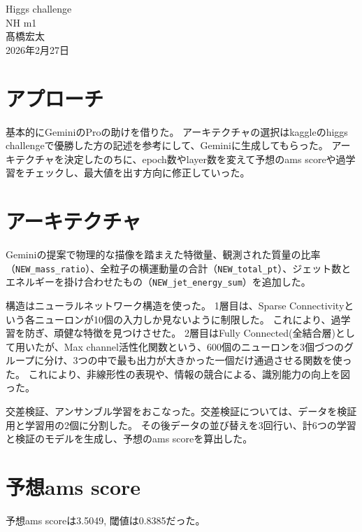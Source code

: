 \documentclass[12pt,a4paper]{jsarticle}
\begin{document}
\vspace{-5pt}
\begin{center}
{\gt \Large Higgs challenge }\\[14pt]

{\gt \large NH m1 \\ 髙橋宏太 \\ 2026年2月27日}\\[5pt]



\end{center}

\vspace{10pt}

\section{アプローチ}
基本的にGeminiのProの助けを借りた。
アーキテクチャの選択はkaggleのhiggs challengeで優勝した方の記述を参考にして、Geminiに生成してもらった。
アーキテクチャを決定したのちに、epoch数やlayer数を変えて予想のams scoreや過学習をチェックし、最大値を出す方向に修正していった。

\section{アーキテクチャ}
Geminiの提案で物理的な描像を踏まえた特徴量、観測された質量の比率（\texttt{NEW\_mass\_ratio}）、全粒子の横運動量の合計（\texttt{NEW\_total\_pt}）、ジェット数とエネルギーを掛け合わせたもの（\texttt{NEW\_jet\_energy\_sum}）を追加した。

構造はニューラルネットワーク構造を使った。
1層目は、Sparse Connectivityという各ニューロンが10個の入力しか見ないように制限した。
これにより、過学習を防ぎ、頑健な特徴を見つけさせた。
2層目はFully Connected(全結合層)として用いたが、Max channel活性化関数という、600個のニューロンを3個づつのグループに分け、3つの中で最も出力が大きかった一個だけ通過させる関数を使った。
これにより、非線形性の表現や、情報の競合による、識別能力の向上を図った。

交差検証、アンサンブル学習をおこなった。交差検証については、データを検証用と学習用の2個に分割した。
その後データの並び替えを3回行い、計6つの学習と検証のモデルを生成し、予想のams scoreを算出した。

\section{予想ams score}
予想ams scoreは3.5049, 閾値は0.8385だった。
\end{document}
